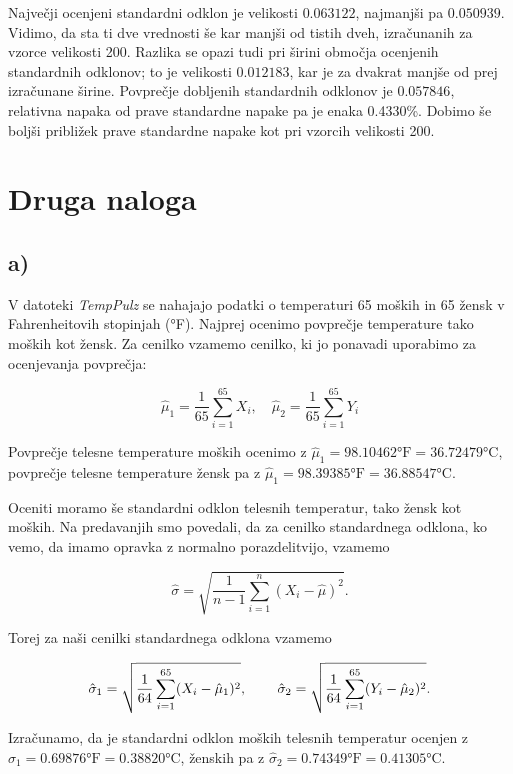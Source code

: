 \documentclass[12pt, a4paper]{article}
\begin{document}
Največji ocenjeni standardni odklon je velikosti  $0.063122$, najmanjši pa
$0.050939$. Vidimo, da sta ti dve vrednosti še kar manjši od tistih dveh, izračunanih
za vzorce velikosti 200. Razlika se opazi tudi pri širini območja ocenjenih 
standardnih odklonov; to je velikosti $0.012183$, kar je za dvakrat manjše od
prej izračunane širine. Povprečje dobljenih standardnih odklonov je $0.057846$, relativna 
napaka od prave standardne napake pa je enaka 0.4330\%. Dobimo še boljši približek 
prave standardne napake kot pri vzorcih velikosti 200.



\section*{Druga naloga}

\subsection*{a)}

V datoteki \emph{TempPulz} se nahajajo podatki o temperaturi  65
moških in 65 žensk v Fahrenheitovih stopinjah (°F). Najprej ocenimo povprečje
temperature tako moških kot žensk. Za cenilko vzamemo cenilko, ki jo ponavadi
uporabimo za ocenjevanja povprečja:

$$ \hat{\mu}_1 = \frac{1}{65}\sum^{65}_{i=1} X_i, \quad 
\hat{\mu}_2 = \frac{1}{65}\sum^{65}_{i=1} Y_i  
$$

Povprečje telesne temperature moških ocenimo z $\hat{\mu}_1 = 98.10462 \text{°F} = 
36.72479$°C, povprečje telesne temperature žensk pa z $\hat{\mu}_1 = 
98.39385 \text{°F} = 36.88547$°C.

Oceniti moramo še standardni odklon telesnih temperatur, tako žensk kot moških.
Na predavanjih smo povedali, da za cenilko standardnega odklona, ko vemo, da
imamo opravka z normalno porazdelitvijo, vzamemo

$$ \hat{\sigma} = \sqrt{\frac{1}{n-1} \sum_{i=1}^{n} (X_i - \hat{\mu})^2}\text{.}
$$

Torej za naši cenilki standardnega odklona vzamemo

$$
\hat{\sigma}_1 = \sqrt{\frac{1}{64} \sum_{i=1}^{65} (X_i - \hat{\mu}_1)^2} \text{, \qquad}
\hat{\sigma}_2 = \sqrt{\frac{1}{64} \sum_{i=1}^{65} (Y_i - \hat{\mu}_2)^2} \text{.}
$$

Izračunamo, da je standardni odklon moških telesnih temperatur ocenjen z
$\hat{\sigma}_1 = 0.69876\text{°F} = 0.38820$°C, ženskih pa z 
$\hat{\sigma}_2 = 0.74349\text{°F} = 0.41305$°C.
\end{document}
